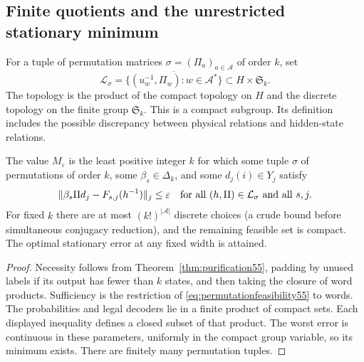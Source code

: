 \subsection{Finite quotients and the unrestricted stationary minimum}
For a tuple of permutation matrices $\sigma=(\Pi_a)_{a\in\mathcal A}$ of order $k$, set
\[
 \mathcal L_\sigma=
 \overline{\{(u_w^{-1},\Pi_w):w\in\mathcal A^*\}}
       \subset H\times\mathfrak S_k.
\]
The topology is the product of the compact topology on $H$ and the discrete topology on the finite group $\mathfrak S_k$. This is a compact subgroup. Its definition includes the possible discrepancy between physical relations and hidden-state relations.

\begin{theorem}\label{thm:stationaryminimum55}
The value $M_\varepsilon$ is the least positive integer $k$ for which some tuple $\sigma$ of permutations of order $k$, some $\beta_s\in\Delta_k$, and some $d_j(i)\in Y_j$ satisfy
\begin{equation}\label{eq:permutationfeasibility55}
 \lVert \beta_s\Pi d_j-F_{s,j}(h^{-1})\rVert_j\le\varepsilon
 \quad\text{for all }(h,\Pi)\in\mathcal L_\sigma\text{ and all }s,j.
\end{equation}
For fixed $k$ there are at most $(k!)^{|\mathcal A|}$ discrete choices (a crude bound before simultaneous conjugacy reduction), and the remaining feasible set is compact. The optimal stationary error at any fixed width is attained.
\end{theorem}
\begin{proof}
Necessity follows from Theorem~\ref{thm:purification55}, padding by unused labels if its output has fewer than $k$ states, and then taking the closure of word products. Sufficiency is the restriction of \eqref{eq:permutationfeasibility55} to words. The probabilities and legal decoders lie in a finite product of compact sets. Each displayed inequality defines a closed subset of that product. The worst error is continuous in these parameters, uniformly in the compact group variable, so its minimum exists. There are finitely many permutation tuples.
\end{proof}

